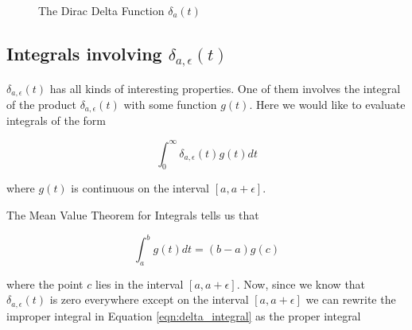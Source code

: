 \documentclass{article}
\theoremstyle{definition}
\begin{document}
\bigskip
\begin{figure}[H]
  \centering
  \caption{The Dirac Delta Function $\delta_{a}(t)$}
  \label{fig:delta_limit}
\end{figure}


\subsection{Integrals involving $\delta_{a,\epsilon}(t)$}
$\delta_{a,\epsilon}(t)$ has all kinds of interesting properties. One of them involves the integral of the product $\delta_{a,\epsilon}(t)$ with some function $g(t)$.  
Here we would like to evaluate integrals of the form

\bigskip
\begin{equation}
  \int_{0}^{\infty} \delta_{a,\epsilon}(t) g(t) dt
  \label{eqn:delta_integral}
\end{equation}

\bigskip
\noindent
where $g(t)$ is continuous on the interval $[a, a+\epsilon]$. 
 
\bigskip
\noindent
The Mean Value Theorem for Integrals  \cite{wiki:meam_value_theorem_for_integrals}  tells us that

\begin{equation}
  \int_{a}^{b} g(t) dt = (b -a) g(c)
  \label{eqn:mvti}
\end{equation}

\bigskip
\noindent
where the point $c$ lies in the interval $[a, a+\epsilon]$. Now, since we know that $\delta_{a,\epsilon}(t)$ is zero everywhere except on the interval
$[a, a+\epsilon]$ we can rewrite the improper integral in Equation \ref{eqn:delta_integral} as the proper integral
\end{document}
